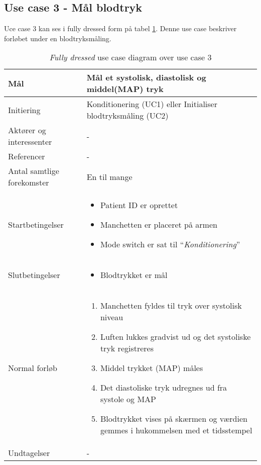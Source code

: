 	\subsection{Use case 3 - Mål blodtryk}
	Uce case 3 kan ses i fully dressed form på tabel \ref{tab:uc3}. Denne use case beskriver forløbet under en blodtryksmåling.
	\begin{table}[H]
		\begin{center}
			\begin{tabular}{ | p{} | p{}| } 
				\hline
				Mål & Mål et systolisk, diastolisk og middel(MAP) tryk\\ 
				\hline
				Initiering &  Konditionering (UC1) eller Initialiser blodtryksmåling (UC2)\\
				\hline
				Aktører og interessenter & - \\
				\hline
				Referencer & - \\ 
				\hline
				Antal samtlige forekomster & En til mange\\ 
				\hline	
				Startbetingelser & 
				\begin{itemize}
					\item Patient ID er oprettet
					\item Manchetten er placeret på armen
					\item Mode switch er sat til “\textit{Konditionering}”
				\end{itemize} \\ 
				\hline
				Slutbetingelser & 
				\begin{itemize}
					\item Blodtrykket er mål
				\end{itemize} \\ 
				\hline
				Normal forløb & \begin{enumerate}
					\setlength\itemsep{0cm} %
					\item Manchetten fyldes til tryk over systolisk niveau 
					\item Luften lukkes gradvist ud og det systoliske tryk registreres 
					\item Middel trykket (MAP) måles 
					\item Det diastoliske tryk udregnes ud fra systole og MAP 
					\item Blodtrykket vises på skærmen og værdien gemmes i hukommelsen med et tidsstempel 
				\end{enumerate} \\ 
				\hline
				Undtagelser & -\\ 
				\hline
			\end{tabular}
		\end{center}
			\caption{\textit{Fully dressed} use case diagram over use case 3} \label{tab:uc3}
			\end{table}
			\newpage